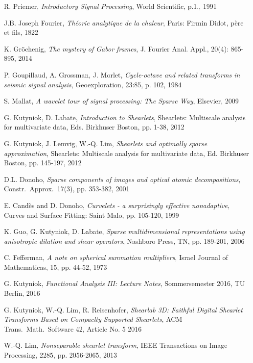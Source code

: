 \documentclass[11pt, english, singlespacing, headsepline, ]{MastersDoctoralThesis}
\theoremstyle{definition}
\begin{document}
\begin{thebibliography}{90}
	R. Priemer,
	\emph{Introductory Signal Processing},
	World Scientific, p.1.,
	1991

	J.B. Joseph Fourier,
	\emph{Théorie analytique de la chaleur},
	Paris: Firmin Didot, père et fils, 
	1822

	K. Gr\"ochenig,
	\emph{The mystery of Gabor frames},
	J. Fourier Anal. Appl., 20(4): 865-895,
	2014	

	P. Goupillaud, A. Grossman, J. Morlet,
	\emph{Cycle-octave and related transforms in seismic signal analysis},
	Geoexploration, 23:85, p. 102,
	1984

	S. Mallat,
	\emph{A wavelet tour of signal processing: The Sparse Way},
	Elsevier, 
	2009

	G. Kutyniok, D. Labate,
	\emph{Introduction to Shearlets},
	Shearlets: Multiscale analysis for multivariate data, Eds. Birkhuser Boston, pp. 1-38,
	2012

	G. Kutyniok, J. Lemvig, W.-Q. Lim,
	\emph{Shearlets and optimally sparse approximation},
	Shearlets: Multiscale analysis for multivariate data, Ed. Birkhuser Boston, pp. 145-197,
	2012

	D.L. Donoho,
	\emph{Sparse components of images and optical atomic decompositions},
	Constr.\ Approx.\, 17(3), pp. 353-382,
	2001

	E. Candès and D. Donoho,
	\emph{Curvelets - a surprisingly effective nonadaptive},
	Curves and Surface Fitting: Saint Malo, pp. 105-120,
	1999

	K. Guo, G. Kutyniok, D. Labate,
	\emph{Sparse multidimensional representations using anisotropic dilation and shear operators},
	Nashboro Press, TN, pp. 189-201,
	2006
	
	C. Fefferman, 
	\emph{A note on spherical summation multipliers},
	Israel Journal of Mathematicas, 15, pp. 44-52,
	1973

	G. Kutyniok,
	\emph{Functional Analysis III: Lecture Notes},
	Sommersemester 2016, TU Berlin, 
	2016

	G. Kutyniok, W.-Q. Lim, R. Reisenhofer,
	\emph{Shearlab 3D: Faithful Digital Shearlet Transforms Based on Compaclty Supported Shearlets},
	ACM Trans.\ Math.\ Software 42, Article No. 5
	2016

	W.-Q. Lim,
	\emph{Nonseparable shearlet transform},
	IEEE Transactions on Image Processing, 2285, pp. 2056-2065,
	2013


\end{thebibliography}
\end{document}

